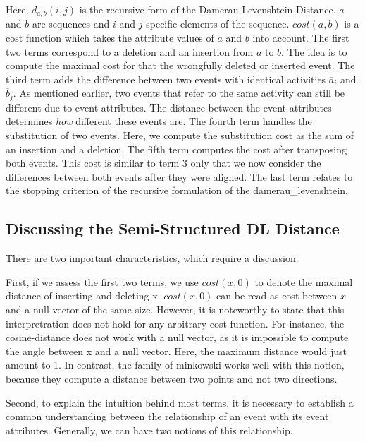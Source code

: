 \documentclass[./../../paper.tex]{subfiles}
\begin{document}
\noindent Here, $d_{a, b}(i, j)$ is the recursive form of the Damerau-Levenshtein-Distance. $a$ and $b$ are sequences and $i$ and $j$ specific elements of the sequence. $cost(a,b)$ is a cost function which takes the attribute values of $a$ and $b$ into account. 
The first two terms correspond to a deletion and an insertion from $a$ to $b$. The idea is to compute the maximal cost for that the wrongfully deleted or inserted event. 
The third term adds the difference between two events with identical activities $\overline{a}_i$ and $\overline{b}_j$. As mentioned earlier, two events that refer to the same activity can still be different due to event attributes. The distance between the event attributes determines \emph{how} different these events are. 
The fourth term handles the substitution of two events. Here, we compute the substitution cost as the sum of an insertion and a deletion. 
The fifth term computes the cost after transposing both events. This cost is similar to term 3 only that we now consider the differences between both events after they were aligned. The last term relates to the stopping criterion of the recursive formulation of the \gls{damerau_levenshtein}.  


\subsection{Discussing the Semi-Structured DL Distance}
There are two important characteristics, which require a discussion.

First, if we assess the first two terms, we use $cost(x,0)$ to denote the maximal distance of inserting and deleting x. $cost(x,0)$ can be read as cost between $x$ and a null-vector of the same size. However, it is noteworthy to state that this interpretration does not hold for any arbitrary cost-function. For instance, the cosine-distance does not work with a null vector, as it is impossible to compute the angle between x and a null vector. Here, the maximum distance would just amount to 1. In contrast, the family of \Gls{minkowski} works well with this notion, because they compute a distance between two points and not two directions. 

Second, to explain the intuition behind most terms, it is necessary to establish a common understanding between the relationship of an event with its event attributes. Generally, we can have two notions of this relationship. 
\end{document}
